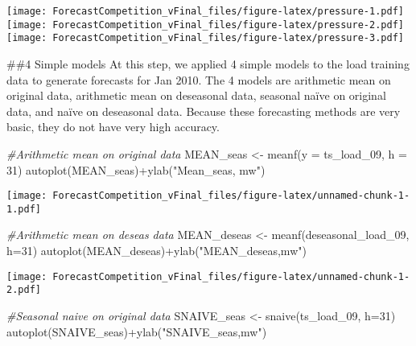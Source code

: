 \documentclass[
]{article}
\newenvironment{Shaded}{\begin{snugshade}}{\end{snugshade}}
\newcommand{\AttributeTok}[1]{\textcolor[rgb]{0.77,0.63,0.00}{#1}}
\newcommand{\CommentTok}[1]{\textcolor[rgb]{0.56,0.35,0.01}{\textit{#1}}}
\newcommand{\DecValTok}[1]{\textcolor[rgb]{0.00,0.00,0.81}{#1}}
\newcommand{\FunctionTok}[1]{\textcolor[rgb]{0.00,0.00,0.00}{#1}}
\newcommand{\NormalTok}[1]{#1}
\newcommand{\OtherTok}[1]{\textcolor[rgb]{0.56,0.35,0.01}{#1}}
\newcommand{\SpecialCharTok}[1]{\textcolor[rgb]{0.00,0.00,0.00}{#1}}
\newcommand{\StringTok}[1]{\textcolor[rgb]{0.31,0.60,0.02}{#1}}
\begin{document}
\texttt{[image: ForecastCompetition\_vFinal\_files/figure-latex/pressure-1.pdf]}
\texttt{[image: ForecastCompetition\_vFinal\_files/figure-latex/pressure-2.pdf]}
\texttt{[image: ForecastCompetition\_vFinal\_files/figure-latex/pressure-3.pdf]}

\#\#4 Simple models At this step, we applied 4 simple models to the load
training data to generate forecasts for Jan 2010. The 4 models are
arithmetic mean on original data, arithmetic mean on deseasonal data,
seasonal naïve on original data, and naïve on deseasonal data. Because
these forecasting methods are very basic, they do not have very high
accuracy.

\begin{Shaded}
\begin{Highlighting}[]
\CommentTok{\#Arithmetic mean on original data}
\NormalTok{MEAN\_seas }\OtherTok{\textless{}{-}} \FunctionTok{meanf}\NormalTok{(}\AttributeTok{y =}\NormalTok{ ts\_load\_09, }\AttributeTok{h =} \DecValTok{31}\NormalTok{)}
\FunctionTok{autoplot}\NormalTok{(MEAN\_seas)}\SpecialCharTok{+}\FunctionTok{ylab}\NormalTok{(}\StringTok{"Mean\_seas, mw"}\NormalTok{)}
\end{Highlighting}
\end{Shaded}

\texttt{[image: ForecastCompetition\_vFinal\_files/figure-latex/unnamed-chunk-1-1.pdf]}

\begin{Shaded}
\begin{Highlighting}[]
\CommentTok{\#Arithmetic mean on deseas data}
\NormalTok{MEAN\_deseas }\OtherTok{\textless{}{-}} \FunctionTok{meanf}\NormalTok{(deseasonal\_load\_09, }\AttributeTok{h=}\DecValTok{31}\NormalTok{)}
\FunctionTok{autoplot}\NormalTok{(MEAN\_deseas)}\SpecialCharTok{+}\FunctionTok{ylab}\NormalTok{(}\StringTok{"MEAN\_deseas,mw"}\NormalTok{)}
\end{Highlighting}
\end{Shaded}

\texttt{[image: ForecastCompetition\_vFinal\_files/figure-latex/unnamed-chunk-1-2.pdf]}

\begin{Shaded}
\begin{Highlighting}[]
\CommentTok{\#Seasonal naive on original data}
\NormalTok{SNAIVE\_seas }\OtherTok{\textless{}{-}} \FunctionTok{snaive}\NormalTok{(ts\_load\_09, }\AttributeTok{h=}\DecValTok{31}\NormalTok{)}
\FunctionTok{autoplot}\NormalTok{(SNAIVE\_seas)}\SpecialCharTok{+}\FunctionTok{ylab}\NormalTok{(}\StringTok{"SNAIVE\_seas,mw"}\NormalTok{)}
\end{Highlighting}
\end{Shaded}
\end{document}

